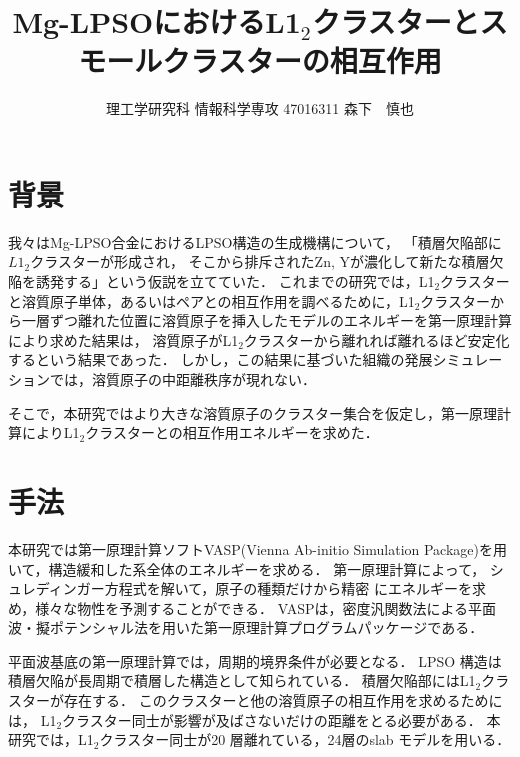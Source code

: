 \documentclass[a4j,twocolumn]{jsarticle}
\begin{document}
\title{Mg-LPSOにおけるL1$_2$クラスターとスモールクラスターの相互作用}
\author{理工学研究科 \hspace{5mm} 情報科学専攻 \hspace{5mm} 47016311 \hspace{5mm} 森下　慎也}
\date{}
\maketitle

\vspace{-1.0\baselineskip}

\section{背景}
我々はMg-LPSO合金におけるLPSO構造の生成機構について，
「積層欠陥部に$L1_2$クラスターが形成され，
そこから排斥されたZn, Yが濃化して新たな積層欠陥を誘発する」という仮説を立てていた\cite{sakamoto}．
これまでの研究では，L1$_2$クラスターと溶質原子単体，あるいはペアとの相互作用を調べるために，L1$_2$クラスターから一層ずつ離れた位置に溶質原子を挿入したモデルのエネルギーを第一原理計算により求めた結果は，
溶質原子がL1$_2$クラスターから離れれば離れるほど安定化するという結果であった．
しかし，この結果に基づいた組織の発展シミュレーションでは，溶質原子の中距離秩序が現れない．


そこで，本研究ではより大きな溶質原子のクラスター集合を仮定し，第一原理計算によりL1$_2$クラスターとの相互作用エネルギーを求めた．

\vspace{-0.2\baselineskip}

\section{手法}
本研究では第一原理計算ソフトVASP(Vienna Ab-initio Simulation Package)を用いて，構造緩和した系全体のエネルギーを求める．
第一原理計算によって，
シュレディンガー方程式を解いて，原子の種類だけから精密
にエネルギーを求め，様々な物性を予測することができる．
VASPは，密度汎関数法による平面波・擬ポテンシャル法を用いた第一原理計算プログラムパッケージである．

平面波基底の第一原理計算では，周期的境界条件が必要となる．
LPSO 構造は積層欠陥が長周期で積層した構造として知られている．
積層欠陥部にはL1$_2$クラスターが存在する．
このクラスターと他の溶質原子の相互作用を求めるためには，
L1$_2$クラスター同士が影響が及ばさないだけの距離をとる必要がある．
本研究では，L1$_2$クラスター同士が20 層離れている，24層のslab モデルを用いる．
\end{document}
